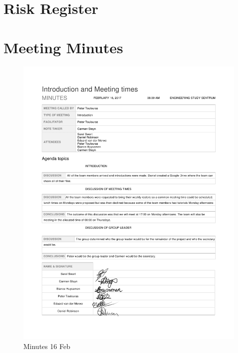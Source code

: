 \begin{appendices}
\begin{landscape}
\end{landscape}

\section{Risk Register}
\section{Meeting Minutes}

\begin{figure}[H]
\centering
\includegraphics[scale=0.25]{Meeting_minutes_16_Feb.png}
\caption{Minutes 16 Feb}
\end{figure}


\end{appendices}
